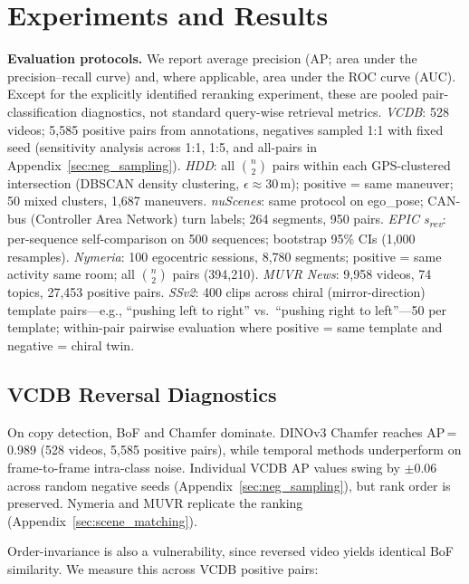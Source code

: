 \documentclass{article}
\theoremstyle{remark}
\begin{document}
\section{Experiments and Results}

\textbf{Evaluation protocols.} We report average precision (AP; area under the precision--recall curve) and, where applicable, area under the ROC curve (AUC). Except for the explicitly identified reranking experiment, these are pooled pair-classification diagnostics, not standard query-wise retrieval metrics. \emph{VCDB}: 528 videos; 5{,}585 positive pairs from annotations, negatives sampled 1:1 with fixed seed (sensitivity analysis across 1:1, 1:5, and all-pairs in Appendix~\ref{sec:neg_sampling}). \emph{HDD}: all $\binom{n}{2}$ pairs within each GPS-clustered intersection (DBSCAN density clustering, $\epsilon\!\approx\!30$\,m); positive = same maneuver; 50 mixed clusters, 1{,}687 maneuvers. \emph{nuScenes}: same protocol on ego\_pose; CAN-bus (Controller Area Network) turn labels; 264 segments, 950 pairs. \emph{EPIC s\textsubscript{rev}}: per-sequence self-comparison on 500 sequences; bootstrap 95\% CIs (1{,}000 resamples). \emph{Nymeria}: 100 egocentric sessions, 8{,}780 segments; positive = same activity same room; all $\binom{n}{2}$ pairs (394{,}210). \emph{MUVR News}: 9{,}958 videos, 74 topics, 27{,}453 positive pairs. \emph{SSv2}: 400 clips across chiral (mirror-direction) template pairs---e.g., ``pushing left to right'' vs.\ ``pushing right to left''---50 per template; within-pair pairwise evaluation where positive = same template and negative = chiral twin.

\subsection{VCDB Reversal Diagnostics}

On copy detection, BoF and Chamfer dominate. DINOv3 Chamfer reaches AP\,=\,0.989 (528 videos, 5{,}585 positive pairs), while temporal methods underperform on frame-to-frame intra-class noise. Individual VCDB AP values swing by ${\pm}0.06$ across random negative seeds (Appendix~\ref{sec:neg_sampling}), but rank order is preserved. Nymeria and MUVR replicate the ranking (Appendix~\ref{sec:scene_matching}).

Order-invariance is also a vulnerability, since reversed video yields identical BoF similarity. We measure this across VCDB positive pairs:
\end{document}
